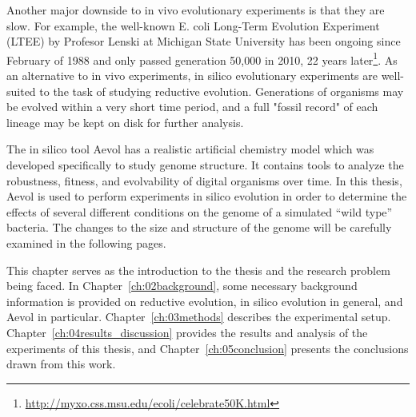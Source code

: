 Another major downside to in vivo evolutionary experiments is that they are slow. For example, the well-known E. coli Long-Term Evolution Experiment (LTEE) by Profesor Lenski at Michigan State University has been ongoing since February of 1988 and only passed generation 50,000 in 2010, 22 years later\footnote{\url{http://myxo.css.msu.edu/ecoli/celebrate50K.html}}. As an alternative to in vivo experiments, in silico evolutionary experiments are well-suited to the task of studying reductive evolution. Generations of organisms may be evolved within a very short time period, and a full "fossil record" of each lineage may be kept on disk for further analysis. 

The in silico tool Aevol has a realistic artificial chemistry model which was developed specifically to study genome structure. It contains tools to analyze the robustness, fitness, and evolvability of digital organisms over time.  In this thesis, Aevol is used to perform experiments in silico evolution in order to determine the effects of several different conditions on the genome of a simulated ``wild type'' bacteria. The changes to the size and structure of the genome will be carefully examined in the following pages. 



This chapter serves as the introduction to the thesis and the research problem being faced. In Chapter~\ref{ch:02background}, some necessary background information is provided on reductive evolution, in silico evolution in general, and Aevol in particular. Chapter~\ref{ch:03methods} describes the experimental setup. Chapter~\ref{ch:04results_discussion}
provides the results and analysis of the experiments of this thesis, and Chapter~\ref{ch:05conclusion} presents the conclusions drawn from this work. 


